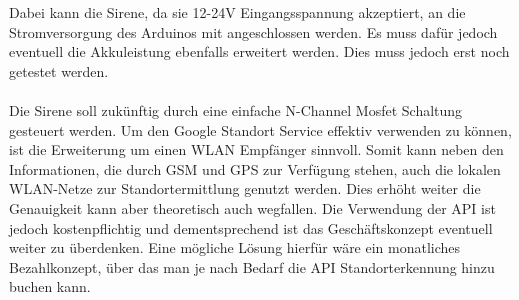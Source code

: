 Dabei kann die Sirene, da sie 12-24V Eingangsspannung akzeptiert, an die Stromversorgung des Arduinos mit angeschlossen werden. Es muss dafür jedoch eventuell die Akkuleistung ebenfalls erweitert werden. Dies muss jedoch erst noch getestet werden. 
\\
\\
Die Sirene soll zukünftig durch eine einfache N-Channel Mosfet Schaltung gesteuert werden.
Um den Google Standort Service effektiv verwenden zu können, ist die Erweiterung um einen WLAN Empfänger sinnvoll. Somit kann neben den Informationen, die durch GSM und GPS zur Verfügung stehen, auch die lokalen WLAN-Netze zur Standortermittlung genutzt werden. Dies erhöht weiter die Genauigkeit kann aber theoretisch auch wegfallen. Die Verwendung der API ist jedoch kostenpflichtig und dementsprechend ist das Geschäftskonzept eventuell weiter zu überdenken. Eine mögliche Lösung hierfür wäre ein monatliches Bezahlkonzept, über das man je nach Bedarf die API Standorterkennung hinzu buchen kann.
\\
\\
